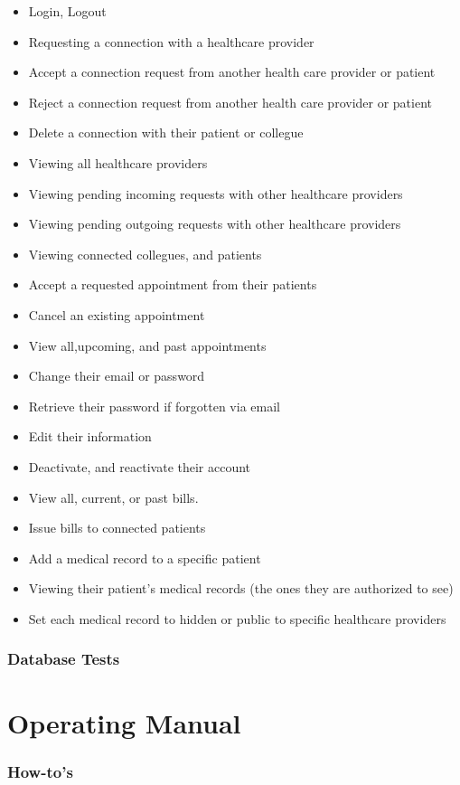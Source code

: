 \documentclass[12pt]{report}
\begin{document}
\begin{itemize}
\item Login, Logout
\item Requesting a connection with a healthcare provider
\item Accept a connection request from another health care provider or patient
\item Reject a connection request from another health care provider or patient
\item Delete a connection with their patient or collegue
\item Viewing all healthcare providers
\item Viewing pending incoming requests with other healthcare providers
\item Viewing pending outgoing requests with other healthcare providers
\item Viewing connected collegues, and patients
\item Accept a requested appointment from their patients
\item Cancel an existing appointment
\item View all,upcoming, and past appointments
\item Change their email or password
\item Retrieve their password if forgotten via email
\item Edit their information
\item Deactivate, and reactivate their account
\item View all, current, or past bills.
\item Issue bills to connected patients
\item Add a medical record to a specific patient
\item Viewing their patient's medical records (the ones they are authorized to see)
\item Set each medical record to hidden or public to specific healthcare providers
\end{itemize}

\subsection{Database Tests}

\chapter{Operating Manual}
\subsection{How-to's}
\end{document}
